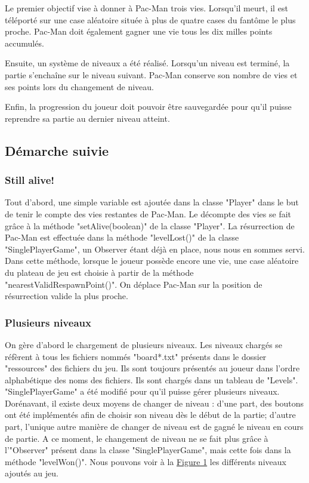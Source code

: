 \documentclass[a4paper,12pt]{report} %
\begin{document}
Le premier objectif vise à donner à Pac-Man trois vies. Lorsqu'il
meurt, il est téléporté sur une case aléatoire située à plus de quatre cases
du fantôme le plus proche. Pac-Man doit également gagner une vie tous
les dix milles points accumulés.

Ensuite, un système de niveaux a été réalisé. Lorsqu'un
niveau est terminé, la partie s'enchaîne sur le niveau suivant. Pac-Man
conserve son nombre de vies et ses points lors du changement de niveau.

Enfin, la progression du joueur doit pouvoir être sauvegardée pour
qu'il puisse reprendre sa partie au dernier niveau atteint.

\subsection{Démarche suivie}
\subsubsection{Still alive!}
Tout d'abord, une simple variable est ajoutée dans la classe "Player"
dans le but de tenir le compte des vies restantes de Pac-Man. Le décompte des
vies se fait grâce à la méthode "setAlive(boolean)" de la classe "Player".
La résurrection de Pac-Man est effectuée dans la méthode "levelLost()" de
la classe "SinglePlayerGame", un Observer étant déjà en place, nous nous en sommes servi. Dans cette méthode, lorsque le joueur possède encore une vie,
une case aléatoire du plateau de jeu est choisie à partir de la méthode "nearestValidRespawnPoint()". On déplace Pac-Man sur la position de résurrection valide la plus proche.

\subsubsection{Plusieurs niveaux}
On gère d'abord le chargement de plusieurs niveaux. Les niveaux chargés
se réfèrent à tous les fichiers nommés "board{*}.txt" présents dans le dossier
"ressources" des fichiers du jeu. Ils sont toujours présentés au joueur
dans l'ordre alphabétique des noms des fichiers. Ils sont chargés dans
un tableau de "Levels". "SinglePlayerGame" a été modifié pour qu'il puisse
gérer plusieurs niveaux. Dorénavant, il existe deux moyens de changer de niveau :
 d'une part, des boutons ont été implémentés afin de choisir son niveau dès le début de la partie; d'autre part, l'unique autre manière de changer de niveau est de gagné le niveau en cours de partie. A ce moment,
le changement de niveau ne se fait plus grâce à l'"Observer" présent
dans la classe "SinglePlayerGame", mais cette fois dans la méthode "levelWon()". Nous pouvons voir à la \hyperref[figure1]{Figure 1} les différents niveaux ajoutés au jeu.
\end{document}
